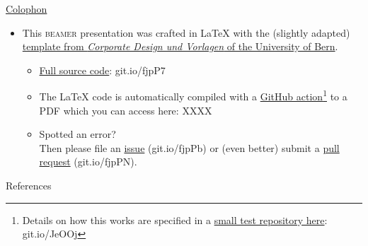 \documentclass[aspectratio=169,10pt]{beamer}
\begin{document}
\begin{frame}{\href{https://en.wikipedia.org/wiki/Colophon_(publishing)}{Colophon}}
	\begin{itemize} 
		\item This \textsc{beamer} presentation was crafted in \LaTeX\xspace with the (slightly adapted) \href{http://intern.unibe.ch/dienstleistungen/corporate_design_und_vorlagen/praesentationen/index_ger.html}{template from \emph{Corporate Design und Vorlagen} of the University of Bern}.
		\begin{itemize}
			\item \href{https://github.com/habi/lecture.microtomography/}{Full source code}: git.io/fjpP7
			\item The \LaTeX\xspace code is automatically compiled with a \href{https://github.com/actions}{GitHub action}\footnote{Details on how this works are specified in a \href{https://github.com/habi/latex-test/}{small test repository here}: git.io/JeOOj} to a PDF which you can access here: XXXX
			\item Spotted an error?\\%
				Then please file an \href{https://github.com/habi/lecture.microtomography/issues}{issue} (git.io/fjpPb) or (even better) submit a \href{https://github.com/habi/lecture.microtomography/pulls}{pull request} (git.io/fjpPN).
		\end{itemize}
	\end{itemize}
\end{frame}

\begin{frame}{References}
	\printbibliography
\end{frame}
\end{document}
